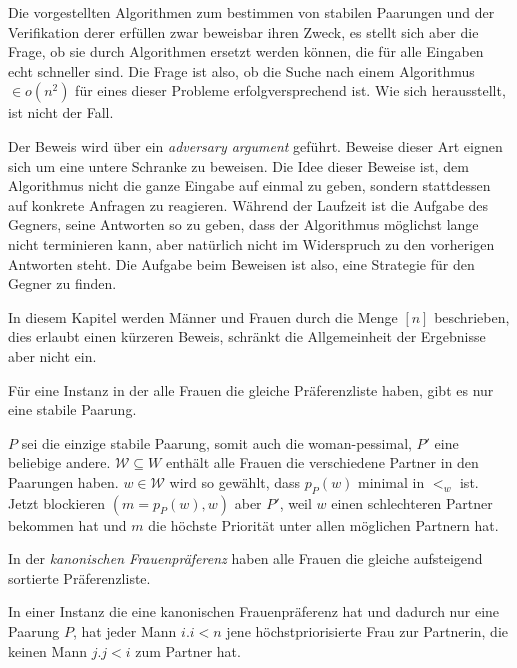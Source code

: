 Die vorgestellten Algorithmen zum bestimmen von stabilen Paarungen und der Verifikation derer erfüllen zwar beweisbar ihren Zweck, es stellt sich aber die Frage, ob sie durch Algorithmen ersetzt werden können, die für alle Eingaben echt schneller sind. Die Frage ist also, ob die Suche nach einem Algorithmus $\in o(n^2)$ für eines dieser Probleme erfolgversprechend ist. Wie sich herausstellt, ist nicht der Fall.\par

Der Beweis wird über ein \textit{adversary argument} geführt. Beweise dieser Art eignen sich um eine untere Schranke zu beweisen. Die Idee dieser Beweise ist, dem Algorithmus nicht die ganze Eingabe auf einmal zu geben, sondern stattdessen auf konkrete Anfragen zu reagieren. Während der Laufzeit ist die Aufgabe des Gegners, seine Antworten so zu geben, dass der Algorithmus möglichst lange nicht terminieren kann, aber natürlich nicht im Widerspruch zu den vorherigen Antworten steht. Die Aufgabe beim Beweisen ist also, eine Strategie für den Gegner zu finden.\par

In diesem Kapitel werden Männer und Frauen durch die Menge $[n]$ beschrieben, dies erlaubt einen kürzeren Beweis, schränkt die Allgemeinheit der Ergebnisse aber nicht ein.\par

\begin{Lemma}
\label{eine_paarung}
  Für eine Instanz in der alle Frauen die gleiche Präferenzliste haben, gibt es nur eine stabile Paarung.
\end{Lemma}

\begin{Beweis}
\label{eine_paarung_bew}
  $P$ sei die einzige stabile Paarung, somit auch die woman-pessimal, $P'$ eine beliebige andere. $\mathcal{W} \subseteq W$ enthält alle Frauen die verschiedene Partner in den Paarungen haben. $w \in \mathcal{W}$ wird so gewählt, dass $p_{P}(w)$ minimal in $<_{w}$ ist. Jetzt blockieren $(m = p_{P}(w),w)$ aber $P'$, weil $w$ einen schlechteren Partner bekommen hat und $m$ die höchste Priorität unter allen möglichen Partnern hat.
\end{Beweis}

\begin{Definition}
\label{kanonische_listen}
  In der \textit{kanonischen Frauenpräferenz} haben alle Frauen die gleiche aufsteigend sortierte Präferenzliste.
\end{Definition}

\begin{Lemma}
\label{beste_frau}
  In einer Instanz die eine kanonischen Frauenpräferenz hat und dadurch nur eine Paarung $P$, hat jeder Mann $i.i<n$ jene höchstpriorisierte Frau zur Partnerin, die keinen Mann $j.j<i$ zum Partner hat.
\end{Lemma}


